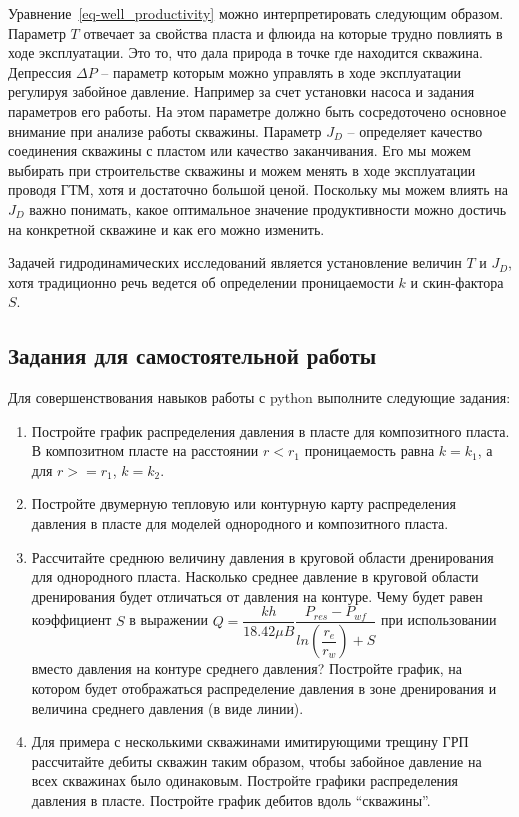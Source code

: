 \documentclass[
  russian,
  letterpaper,
  DIV=11,
  numbers=noendperiod,
  oneside]{scrartcl}
\begin{document}
Уравнение~\ref{eq-well_productivity} можно интерпретировать следующим
образом. Параметр \(T\) отвечает за свойства пласта и флюида на которые
трудно повлиять в ходе эксплуатации. Это то, что дала природа в точке
где находится скважина. Депрессия \(\Delta P\) -- параметр которым можно
управлять в ходе эксплуатации регулируя забойное давление. Например за
счет установки насоса и задания параметров его работы. На этом параметре
должно быть сосредоточено основное внимание при анализе работы скважины.
Параметр \(J_D\) -- определяет качество соединения скважины с пластом
или качество заканчивания. Его мы можем выбирать при строительстве
скважины и можем менять в ходе эксплуатации проводя ГТМ, хотя и
достаточно большой ценой. Поскольку мы можем влиять на \(J_D\) важно
понимать, какое оптимальное значение продуктивности можно достичь на
конкретной скважине и как его можно изменить.

Задачей гидродинамических исследований является установление величин
\(T\) и \(J_D\), хотя традиционно речь ведется об определении
проницаемости \(k\) и скин-фактора \(S\).

\subsection{Задания для самостоятельной
работы}\label{ux437ux430ux434ux430ux43dux438ux44f-ux434ux43bux44f-ux441ux430ux43cux43eux441ux442ux43eux44fux442ux435ux43bux44cux43dux43eux439-ux440ux430ux431ux43eux442ux44b}

Для совершенствования навыков работы с python выполните следующие
задания:

\begin{enumerate}
\def\labelenumi{\arabic{enumi}.}
\item
  Постройте график распределения давления в пласте для композитного
  пласта. В композитном пласте на расстоянии \(r<r_1\) проницаемость
  равна \(k=k_1\), а для \(r>=r_1\), \(k=k_2\).
\item
  Постройте двумерную тепловую или контурную карту распределения
  давления в пласте для моделей однородного и композитного пласта.
\item
  Рассчитайте среднюю величину давления в круговой области дренирования
  для однородного пласта. Насколько среднее давление в круговой области
  дренирования будет отличаться от давления на контуре. Чему будет равен
  коэффициент \(S\) в выражении
  \(Q=\dfrac{kh}{18.42\mu B} \dfrac{P_{res}-P_{wf}}{ln(\dfrac{r_e}{r_w})+S}\)
  при использовании вместо давления на контуре среднего давления?
  Постройте график, на котором будет отображаться распределение давления
  в зоне дренирования и величина среднего давления (в виде линии).
\item
  Для примера с несколькими скважинами имитирующими трещину ГРП
  рассчитайте дебиты скважин таким образом, чтобы забойное давление на
  всех скважинах было одинаковым. Постройте графики распределения
  давления в пласте. Постройте график дебитов вдоль ``скважины''.
\end{enumerate}
\end{document}
